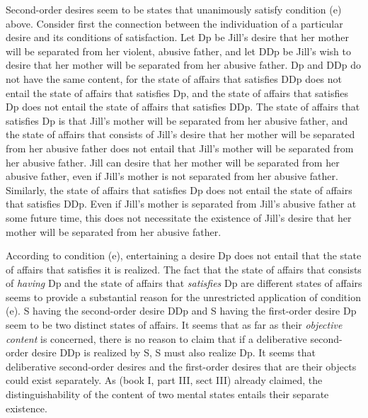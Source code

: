 \documentclass[output=paper]{langscibook}
\begin{document}
Second-order desires seem to be states that unanimously satisfy condition (e) above. Consider first the connection between the individuation of a particular desire and its conditions of satisfaction. Let Dp be Jill’s desire that her mother will be separated from her violent, abusive father, and let DDp be Jill’s wish to desire that her mother will be separated from her abusive father. Dp and DDp do not have the same content, for the state of affairs that satisfies DDp does not entail the state of affairs that satisfies Dp, and the state of affairs that satisfies Dp does not entail the state of affairs that satisfies DDp. The state of affairs that satisfies Dp is that Jill’s mother will be separated from her abusive father, and the state of affairs that consists of Jill's desire that her mother will be separated from her abusive father does not entail that Jill’s mother will be separated from her abusive father. Jill can desire that her mother will be separated from her abusive father, even if Jill’s mother is not separated from her abusive father. Similarly, the state of affairs that satisfies Dp does not entail the state of affairs that satisfies DDp. Even if Jill’s mother is separated from Jill’s abusive father at some future time, this does not necessitate the existence of Jill's desire that her mother will be separated from her abusive father.

According to condition (e), entertaining a desire Dp does not entail that the state of affairs that satisfies it is realized. The fact that the state of affairs that consists of \textit{having} Dp and the state of affairs that \textit{satisfies} Dp are different states of affairs seems to provide a substantial reason for the unrestricted application of condition (e). S having the second-order desire DDp and S having the first-order desire Dp seem to be two distinct states of affairs. It seems that as far as their \textit{objective content} is concerned, there is no reason to claim that if a deliberative second-order desire DDp is realized by S, S must also realize Dp. It seems that deliberative second-order desires and the first-order desires that are their objects could exist separately. As \citet{hume2000treatise} (book I, part III, sect III) already claimed, the distinguishability of the content of two mental states entails their separate existence.
\end{document}
